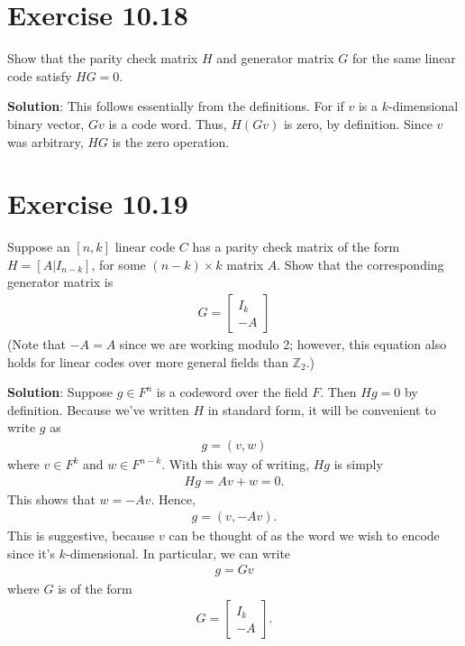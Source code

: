 \documentclass{book}
\begin{document}
\section*{Exercise 10.18}
    Show that the parity check matrix $H$ and generator matrix $G$ for the same linear code satisfy $HG = 0$. 

    \textbf{Solution}: This follows essentially from the definitions. For if $v$ is a $k$-dimensional binary vector, $Gv$ is a code word. Thus, $H(Gv)$ is zero, by definition. Since $v$ was arbitrary, $HG$ is the zero operation.

\section*{Exercise 10.19}
    Suppose an $[n,k]$ linear code $C$ has a parity check matrix of the form $H = [A\vert I_{n-k}]$, for some $(n-k)\times k$ matrix $A$. Show that the corresponding generator matrix is
    \begin{align}
        G = \begin{bmatrix}
            I_k \\
            -A
        \end{bmatrix}
    \end{align}
    (Note that $-A = A$ since we are working modulo 2; however, this equation also holds for linear codes over more general fields than $\mathbb{Z}_2$.)

    \textbf{Solution}: Suppose $g \in F^n$ is a codeword over the field $F$. Then $Hg = 0$ by definition. Because we've written $H$ in standard form, it will be convenient to write $g$ as
    \begin{align}
        g = (v, w)
    \end{align}
    where $v\in F^k$ and $w\in F^{n-k}$. With this way of writing, $Hg$ is simply
    \begin{align}
        Hg = Av + w =0.
    \end{align}
    This shows that $w = -Av$. Hence,
    \begin{align}
        g = (v, -Av).
    \end{align}
    This is suggestive, because $v$ can be thought of as the word we wish to encode since it's $k$-dimensional. In particular, we can write
    \begin{align}
        g = Gv
    \end{align}
    where $G$ is of the form 
    \begin{align}
        G = \begin{bmatrix}
            I_k \\
            -A
        \end{bmatrix}.
    \end{align}
    
\end{document}

